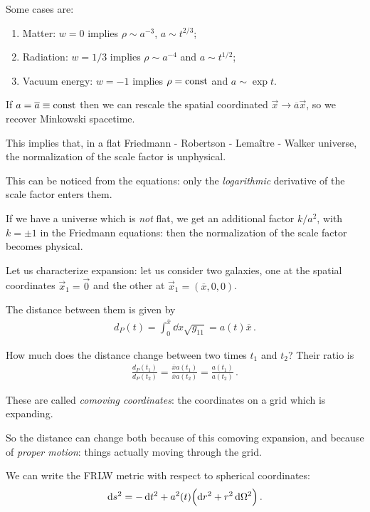 \documentclass[main.tex]{subfiles}
\begin{document}
Some cases are: 
\begin{enumerate}
    \item Matter: \(w=0\) implies \(\rho \sim a^{-3}\), \(a \sim t^{2/3}\);
    \item Radiation: \(w=1/3\) implies \(\rho \sim a^{-4}\) and \(a \sim t^{1/2}\);
    \item Vacuum energy: \(w = -1\) implies \(\rho = \text{const}\) and \(a \sim \exp t\).
\end{enumerate}

If \(a = \overline{a} \equiv \text{const}\) then we can rescale the spatial coordinated \(\vec{x} \rightarrow \overline{a} \vec{x}\), so we recover Minkowski spacetime. 

This implies that, in a flat Friedmann - Robertson - Lemaître - Walker universe, the normalization of the scale factor is unphysical. 

This can be noticed from the equations: only the \emph{logarithmic} derivative of the scale factor enters them. 

If we have a universe which is \emph{not} flat, we get an additional factor \(k / a^2\), with \(k = \pm 1\) in the Friedmann equations: then the normalization of the scale factor becomes physical. 

Let us characterize expansion: let us consider two galaxies, one at the spatial coordinates \(\vec{x}_{1} = \vec{0}\) and the other at \(\vec{x}_{1} = (\overline{x}, 0,0)\). 

The distance between them is given  by 
%
\begin{align}
d_{P} (t) = \int_{0}^{\overline{x}} \dd{x} \sqrt{g_{11} } = a(t) \overline{x}
\,.
\end{align}

How much does the distance change between two times \(t_1 \) and \(t_2 \)? Their ratio is 
%
\begin{align}
\frac{  d_{P}(t_1 )}{d_{P}(t_2 )} = \frac{\overline{x} a(t_1 )}{\overline{x} a(t_2 )} = \frac{a(t_1 )}{a(t_2 )}
\,.
\end{align}

These are called \emph{comoving coordinates}: the coordinates on a grid which is expanding. 

So the distance can change both because of this comoving expansion, and because of \emph{proper motion}: things actually moving through the grid. 

We can write the FRLW metric with respect to spherical coordinates: 
%
\begin{align}
\dd{s^2} = - \dd{t^2} + a^2(t) \qty(\dd{r^2} + r^2 \dd{\Omega^2})
\,.
\end{align}
\end{document}

